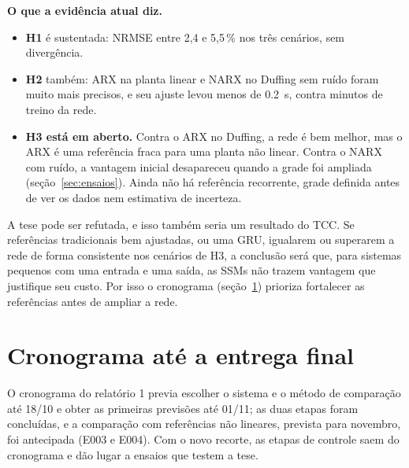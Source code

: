 \documentclass[11pt,a4paper]{article}
\begin{document}
\noindent\textbf{O que a evidência atual diz.}
\begin{itemize}\itemsep0pt
  \item \textbf{H1} é sustentada: NRMSE entre 2,4 e 5,5\,\% nos três cenários, sem divergência.
  \item \textbf{H2} também: ARX na planta linear e NARX no Duffing sem ruído foram muito mais precisos,
  e seu ajuste levou menos de \SI{0,2}{s}, contra minutos de treino da rede.
  \item \textbf{H3 está em aberto.} Contra o ARX no Duffing, a rede é bem melhor, mas o ARX é uma
  referência fraca para uma planta não linear. Contra o NARX com ruído, a vantagem inicial desapareceu
  quando a grade foi ampliada (seção~\ref{sec:ensaios}). Ainda não há referência recorrente, grade
  definida antes de ver os dados nem estimativa de incerteza.
\end{itemize}

A tese pode ser refutada, e isso também seria um resultado do TCC. Se referências tradicionais bem
ajustadas, ou uma GRU, igualarem ou superarem a rede de forma consistente nos cenários de H3, a
conclusão será que, para sistemas pequenos com uma entrada e uma saída, as SSMs não trazem vantagem
que justifique seu custo. Por isso o cronograma (seção~\ref{sec:cronograma}) prioriza fortalecer as
referências antes de ampliar a rede.

\section{Cronograma até a entrega final}\label{sec:cronograma}

O cronograma do relatório 1 previa escolher o sistema e o método de comparação até 18/10 e obter
as primeiras previsões até 01/11; as duas etapas foram concluídas, e a comparação com referências
não lineares, prevista para novembro, foi antecipada (E003 e E004). Com o novo recorte, as etapas de
controle saem do cronograma e dão lugar a ensaios que testem a tese.
\end{document}
